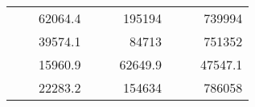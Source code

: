\begin{table}[H]
\begin{tabular}{|ccrccrccc}
\rowcolor[HTML]{DDFDFF} 
\multicolumn{1}{|c|}{\cellcolor[HTML]{FFFFC7}}                                & \multicolumn{1}{c|}{\cellcolor[HTML]{DDFDFF}}                      & \multicolumn{1}{r|}{\cellcolor[HTML]{DAE8FC}62064.4}   & \multicolumn{1}{c|}{\cellcolor[HTML]{FFFFC7}}                                & \multicolumn{1}{c|}{\cellcolor[HTML]{DDFDFF}}                       & \multicolumn{1}{r|}{\cellcolor[HTML]{DDFDFF}195194}    & \multicolumn{1}{c|}{\cellcolor[HTML]{FFFFC7}}                                & \multicolumn{1}{c|}{\cellcolor[HTML]{DDFDFF}}                      & \multicolumn{1}{r|}{\cellcolor[HTML]{DDFDFF}739994}    \\ \cline{3-3} \cline{6-6} \cline{9-9} 
\multicolumn{1}{|c|}{\cellcolor[HTML]{FFFFC7}}                                & \multicolumn{1}{c|}{\cellcolor[HTML]{DDFDFF}}                      & \multicolumn{1}{r|}{\cellcolor[HTML]{DDFDFF}39574.1}   & \multicolumn{1}{c|}{\cellcolor[HTML]{FFFFC7}}                                & \multicolumn{1}{c|}{\cellcolor[HTML]{DDFDFF}}                       & \multicolumn{1}{r|}{\cellcolor[HTML]{DAE8FC}84713}     & \multicolumn{1}{c|}{\cellcolor[HTML]{FFFFC7}}                                & \multicolumn{1}{c|}{\cellcolor[HTML]{DDFDFF}}                      & \multicolumn{1}{r|}{\cellcolor[HTML]{DAE8FC}751352}    \\ \cline{3-3} \cline{6-6} \cline{9-9} 
\rowcolor[HTML]{DDFDFF} 
\multicolumn{1}{|c|}{\cellcolor[HTML]{FFFFC7}}                                & \multicolumn{1}{c|}{\cellcolor[HTML]{DDFDFF}}                      & \multicolumn{1}{r|}{\cellcolor[HTML]{DAE8FC}15960.9}   & \multicolumn{1}{c|}{\cellcolor[HTML]{FFFFC7}}                                & \multicolumn{1}{c|}{\cellcolor[HTML]{DDFDFF}}                       & \multicolumn{1}{r|}{\cellcolor[HTML]{DDFDFF}62649.9}   & \multicolumn{1}{c|}{\cellcolor[HTML]{FFFFC7}}                                & \multicolumn{1}{c|}{\cellcolor[HTML]{DDFDFF}}                      & \multicolumn{1}{r|}{\cellcolor[HTML]{DDFDFF}47547.1}   \\ \cline{3-3} \cline{6-6} \cline{9-9} 
\multicolumn{1}{|c|}{\cellcolor[HTML]{FFFFC7}}                                & \multicolumn{1}{c|}{\cellcolor[HTML]{DDFDFF}}                      & \multicolumn{1}{r|}{\cellcolor[HTML]{DDFDFF}22283.2}   & \multicolumn{1}{c|}{\cellcolor[HTML]{FFFFC7}}                                & \multicolumn{1}{c|}{\cellcolor[HTML]{DDFDFF}}                       & \multicolumn{1}{r|}{\cellcolor[HTML]{DAE8FC}154634}    & \multicolumn{1}{c|}{\cellcolor[HTML]{FFFFC7}}                                & \multicolumn{1}{c|}{\cellcolor[HTML]{DDFDFF}}                      & \multicolumn{1}{r|}{\cellcolor[HTML]{DAE8FC}786058}    \\ \cline{3-3} \cline{6-6} \cline{9-9} 

\end{tabular}
\end{table}
